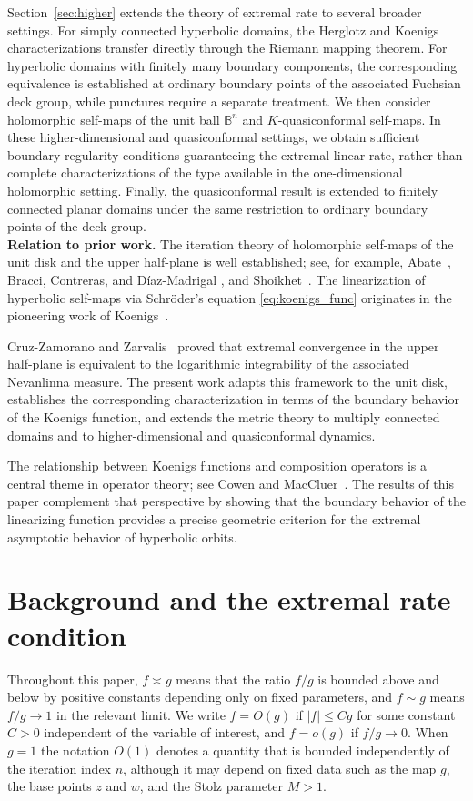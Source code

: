 \documentclass[12pt]{amsart}
\numberwithin{equation}{section}
\theoremstyle{plain}
\theoremstyle{definition}
\begin{document}
Section~\ref{sec:higher} extends the theory of extremal rate to several
broader settings. For simply connected hyperbolic domains, the Herglotz
and Koenigs characterizations transfer directly through the Riemann
mapping theorem. For hyperbolic domains with finitely many boundary
components, the corresponding equivalence is established at ordinary
boundary points of the associated Fuchsian deck group, while punctures
require a separate treatment. We then consider holomorphic self-maps of
the unit ball $\mathbb B^n$ and $K$-quasiconformal self-maps. In these
higher-dimensional and quasiconformal settings, we obtain sufficient
boundary regularity conditions guaranteeing the extremal linear rate,
rather than complete characterizations of the type available in the
one-dimensional holomorphic setting. Finally, the quasiconformal result
is extended to finitely connected planar domains under the same
restriction to ordinary boundary points of the deck group.\\
\noindent
\textbf{Relation to prior work.}
The iteration theory of holomorphic self-maps of the unit disk and the
upper half-plane is well established; see, for example,
Abate~\cite[Section~1.3]{Abate},
Bracci, Contreras, and D\'iaz-Madrigal
\cite[Section~1.8]{bracci2020},
and Shoikhet~\cite[Chapter~1]{Shoikhet}. The linearization of hyperbolic
self-maps via Schr\"oder's equation \eqref{eq:koenigs_func} originates in
the pioneering work of Koenigs~\cite{K}.

Cruz-Zamorano and Zarvalis~\cite{cruz} proved that extremal convergence
in the upper half-plane is equivalent to the logarithmic integrability
of the associated Nevanlinna measure. The present work adapts this
framework to the unit disk, establishes the corresponding characterization
in terms of the boundary behavior of the Koenigs function, and extends
the metric theory to multiply connected domains and to higher-dimensional
and quasiconformal dynamics.

The relationship between Koenigs functions and composition operators is
a central theme in operator theory; see Cowen and
MacCluer~\cite[Chapter~7]{CowenMacCluer}. The results of this paper
complement that perspective by showing that the boundary behavior of the
linearizing function provides a precise geometric criterion for the
extremal asymptotic behavior of hyperbolic orbits.


\section{Background and the extremal rate condition}
\label{sec:prelim}
Throughout this paper, $f\asymp g$ means that the ratio
$f/g$ is bounded above and below by positive constants
depending only on fixed parameters, and $f\sim g$ means
$f/g\to 1$ in the relevant limit.
We write $f=O(g)$ if $|f|\le Cg$ for some constant $C>0$
independent of the variable of interest, and $f=o(g)$ if
$f/g\to 0$. When $g=1$ the notation $O(1)$ denotes a
quantity that is bounded independently of the iteration
index $n$, although it may depend on fixed data such
as the map $g$, the base points $z$ and $w$, and the Stolz
parameter $M>1$.
\end{document}
